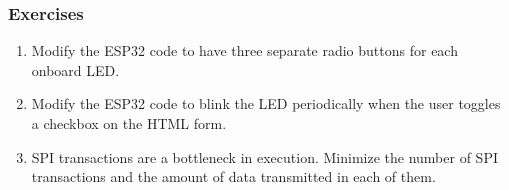 \subsubsection{Exercises}
\begin{enumerate}[resume]
    \item Modify the ESP32 code to have three separate radio buttons for each
    onboard LED.
    \item Modify the ESP32 code to blink the LED periodically when the user
    toggles a checkbox on the HTML form.
    \item SPI transactions are a bottleneck in execution. Minimize the number of
    SPI transactions and the amount of data transmitted in each of them.
\end{enumerate}